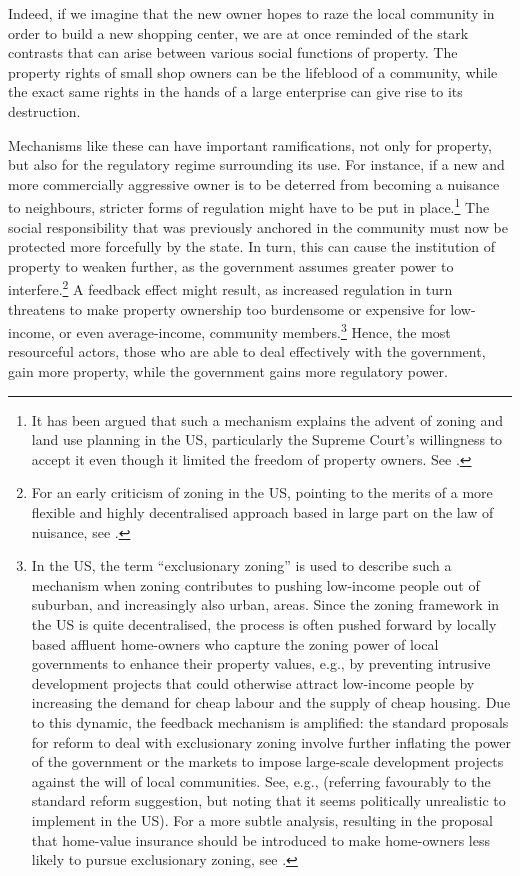 Indeed, if we imagine that the new owner hopes to raze the local community in order to build a new shopping center, we are at once reminded of the stark contrasts that can arise between various social functions of property. The property rights of small shop owners can be the lifeblood of a community, while the exact same rights in the hands of a large enterprise can give rise to its destruction.

Mechanisms like these can have important ramifications, not only for property, but also for the regulatory regime surrounding its use. For instance, if a new and more commercially aggressive owner is to be deterred from becoming a nuisance to neighbours, stricter forms of regulation might have to be put in place.\footnote{It has been argued that such a mechanism explains the advent of zoning and land use planning in the US, particularly the Supreme Court's willingness to accept it even though it limited the freedom of property owners. See \cite[99-100]{shoked11}.} The social responsibility that was previously anchored in the community must now be protected more forcefully by the state. In turn, this can cause the institution of property to weaken further, as the government assumes greater power to interfere.\footnote{For an early criticism of zoning in the US, pointing to the merits of a more flexible and highly decentralised approach based in large part on the law of nuisance, see \cite{ellickson73}.} A feedback effect might result, as increased regulation in turn threatens to make property ownership too burdensome or expensive for low-income, or even average-income, community members.\footnote{In the US, the term ``exclusionary zoning'' is used to describe such a mechanism when zoning contributes to pushing low-income people out of suburban, and increasingly also urban, areas. Since the zoning framework in the US is quite decentralised, the process is often pushed forward by locally based affluent home-owners who capture the zoning power of local governments to enhance their property values, e.g., by preventing intrusive development projects that could otherwise attract low-income people by increasing the demand for cheap labour and the supply of cheap housing. Due to this dynamic, the feedback mechanism is amplified: the standard proposals for reform to deal with exclusionary zoning involve further inflating the power of the government or the markets to impose large-scale development projects against the will of local communities. See, e.g., \cite[117-120]{mangin14} (referring favourably to the standard reform suggestion, but noting that it seems politically unrealistic to implement in the US). For a more subtle analysis, resulting in the proposal that home-value insurance should be introduced to make home-owners less likely to pursue exclusionary zoning, see \cite{fischel04}.} Hence, the most resourceful actors, those who are able to deal effectively with the government, gain more property, while the government gains more regulatory power.

